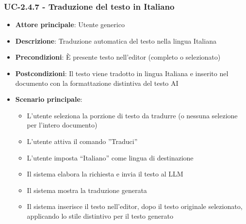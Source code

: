 \documentclass[11pt,a4paper]{article}
\begin{document}
\subsubsection{UC-2.4.7 - Traduzione del testo in Italiano}
\begin{itemize}
    \item \textbf{Attore principale}: Utente generico
    \item \textbf{Descrizione}: Traduzione automatica del testo nella lingua Italiana
    \item \textbf{Precondizioni}: È presente testo nell’editor (completo o selezionato)
    \item \textbf{Postcondizioni}: Il testo viene tradotto in lingua Italiana e inserito nel documento con la formattazione distintiva del testo AI
    \item \textbf{Scenario principale}:
    \begin{itemize}
        \item L’utente seleziona la porzione di testo da tradurre (o nessuna selezione per l'intero documento)
        \item L’utente attiva il comando ”Traduci”
        \item L’utente imposta “Italiano” come lingua di destinazione
        \item Il sistema elabora la richiesta e invia il testo al LLM
        \item Il sistema mostra la traduzione generata
        \item Il sistema inserisce il testo nell'editor, dopo il testo originale selezionato, applicando lo stile distintivo per il testo generato
    \end{itemize}
\end{itemize}
\end{document}
